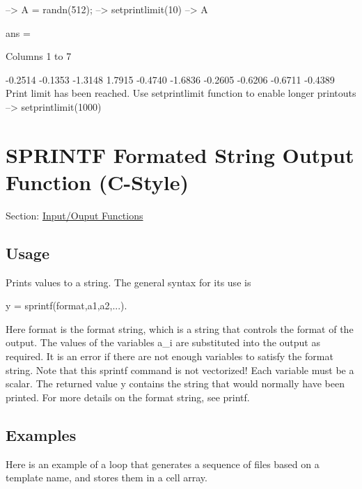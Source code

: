 \begin{DoxyVerbInclude}
--> A = randn(512);
--> setprintlimit(10)
--> A

ans = 

 Columns 1 to 7

   -0.2514   -0.1353   -1.3148    1.7915   -0.4740   -1.6836   -0.2605 
   -0.6206   -0.6711   -0.4389
Print limit has been reached.  Use setprintlimit function to enable longer printouts
--> setprintlimit(1000)
\end{DoxyVerbInclude}
 \hypertarget{io_sprintf}{}\section{S\-P\-R\-I\-N\-T\-F Formated String Output Function (C-\/\-Style)}\label{io_sprintf}
Section\-: \hyperlink{sec_io}{Input/\-Ouput Functions} \hypertarget{vtkwidgets_vtkxyplotwidget_Usage}{}\subsection{Usage}\label{vtkwidgets_vtkxyplotwidget_Usage}
Prints values to a string. The general syntax for its use is \begin{DoxyVerb}  y = sprintf(format,a1,a2,...).
\end{DoxyVerb}
 Here {\ttfamily format} is the format string, which is a string that controls the format of the output. The values of the variables {\ttfamily a\-\_\-i} are substituted into the output as required. It is an error if there are not enough variables to satisfy the format string. Note that this {\ttfamily sprintf} command is not vectorized! Each variable must be a scalar. The returned value {\ttfamily y} contains the string that would normally have been printed. For more details on the format string, see {\ttfamily printf}. \hypertarget{variables_matrix_Examples}{}\subsection{Examples}\label{variables_matrix_Examples}
Here is an example of a loop that generates a sequence of files based on a template name, and stores them in a cell array.



